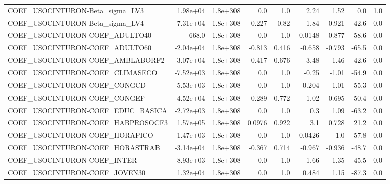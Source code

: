 \begin{tabular}{lrrrrrrrr}
COEF\_USOCINTURON-Beta\_sigma\_LV3   &    1.98e+04 &     1.8e+308 &      0.0 &      1.0 &       2.24 &        1.52 &          0.0 &           1.0 \\
COEF\_USOCINTURON-Beta\_sigma\_LV4   &   -7.31e+04 &     1.8e+308 &   -0.227 &     0.82 &      -1.84 &      -0.921 &        -42.6 &           0.0 \\
COEF\_USOCINTURON-COEF\_ADULTO40    &      -668.0 &     1.8e+308 &      0.0 &      1.0 &    -0.0148 &      -0.877 &        -58.6 &           0.0 \\
COEF\_USOCINTURON-COEF\_ADULTO60    &   -2.04e+04 &     1.8e+308 &   -0.813 &    0.416 &     -0.658 &      -0.793 &        -65.5 &           0.0 \\
COEF\_USOCINTURON-COEF\_AMBLABORF2  &   -3.07e+04 &     1.8e+308 &   -0.417 &    0.676 &      -3.48 &       -1.46 &        -42.6 &           0.0 \\
COEF\_USOCINTURON-COEF\_CLIMASECO   &   -7.52e+03 &     1.8e+308 &      0.0 &      1.0 &      -0.25 &       -1.01 &        -54.9 &           0.0 \\
COEF\_USOCINTURON-COEF\_CONGCD      &   -5.53e+03 &     1.8e+308 &      0.0 &      1.0 &     -0.204 &       -1.01 &        -55.3 &           0.0 \\
COEF\_USOCINTURON-COEF\_CONGEF      &   -4.52e+04 &     1.8e+308 &   -0.289 &    0.772 &      -1.02 &      -0.695 &        -50.4 &           0.0 \\
COEF\_USOCINTURON-COEF\_EDUC\_BASICA &   -2.72e+03 &     1.8e+308 &      0.0 &      1.0 &        0.3 &        1.09 &        -63.2 &           0.0 \\
COEF\_USOCINTURON-COEF\_HABPROSOCF3 &    1.57e+05 &     1.8e+308 &   0.0976 &    0.922 &        3.1 &       0.728 &         21.2 &           0.0 \\
COEF\_USOCINTURON-COEF\_HORAPICO    &   -1.47e+03 &     1.8e+308 &      0.0 &      1.0 &    -0.0426 &        -1.0 &        -57.8 &           0.0 \\
COEF\_USOCINTURON-COEF\_HORASTRAB   &   -3.14e+04 &     1.8e+308 &   -0.367 &    0.714 &     -0.967 &      -0.936 &        -48.7 &           0.0 \\
COEF\_USOCINTURON-COEF\_INTER       &    8.93e+03 &     1.8e+308 &      0.0 &      1.0 &      -1.66 &       -1.35 &        -45.5 &           0.0 \\
COEF\_USOCINTURON-COEF\_JOVEN30     &    1.32e+04 &     1.8e+308 &      0.0 &      1.0 &      0.484 &        1.15 &        -87.3 &           0.0 \\

\end{tabular}
